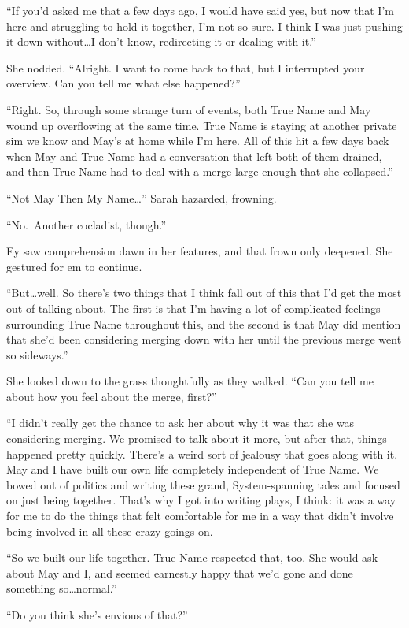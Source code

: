 ``If you'd asked me that a few days ago, I would have said yes, but now that I'm here and struggling to hold it together, I'm not so sure. I think I was just pushing it down without\ldots I don't know, redirecting it or dealing with it.''

She nodded. ``Alright. I want to come back to that, but I interrupted your overview. Can you tell me what else happened?''

``Right. So, through some strange turn of events, both True Name and May wound up overflowing at the same time. True Name is staying at another private sim we know and May's at home while I'm here. All of this hit a few days back when May and True Name had a conversation that left both of them drained, and then True Name had to deal with a merge large enough that she collapsed.''

``Not May Then My Name\ldots{}'' Sarah hazarded, frowning.

``No.~Another cocladist, though.''

Ey saw comprehension dawn in her features, and that frown only deepened. She gestured for em to continue.

``But\ldots well. So there's two things that I think fall out of this that I'd get the most out of talking about. The first is that I'm having a lot of complicated feelings surrounding True Name throughout this, and the second is that May did mention that she'd been considering merging down with her until the previous merge went so sideways.''

She looked down to the grass thoughtfully as they walked. ``Can you tell me about how you feel about the merge, first?''

``I didn't really get the chance to ask her about why it was that she was considering merging. We promised to talk about it more, but after that, things happened pretty quickly. There's a weird sort of jealousy that goes along with it. May and I have built our own life completely independent of True Name. We bowed out of politics and writing these grand, System-spanning tales and focused on just being together. That's why I got into writing plays, I think: it was a way for me to do the things that felt comfortable for me in a way that didn't involve being involved in all these crazy goings-on.

``So we built our life together. True Name respected that, too. She would ask about May and I, and seemed earnestly happy that we'd gone and done something so\ldots normal.''

``Do you think she's envious of that?''


